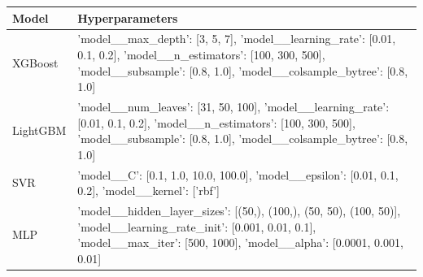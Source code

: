\begin{tabular}{ll}
\toprule
Model & Hyperparameters \\
\midrule
XGBoost & {'model__max_depth': [3, 5, 7], 'model__learning_rate': [0.01, 0.1, 0.2], 'model__n_estimators': [100, 300, 500], 'model__subsample': [0.8, 1.0], 'model__colsample_bytree': [0.8, 1.0]} \\
LightGBM & {'model__num_leaves': [31, 50, 100], 'model__learning_rate': [0.01, 0.1, 0.2], 'model__n_estimators': [100, 300, 500], 'model__subsample': [0.8, 1.0], 'model__colsample_bytree': [0.8, 1.0]} \\
SVR & {'model__C': [0.1, 1.0, 10.0, 100.0], 'model__epsilon': [0.01, 0.1, 0.2], 'model__kernel': ['rbf']} \\
MLP & {'model__hidden_layer_sizes': [(50,), (100,), (50, 50), (100, 50)], 'model__learning_rate_init': [0.001, 0.01, 0.1], 'model__max_iter': [500, 1000], 'model__alpha': [0.0001, 0.001, 0.01]} \\
\bottomrule
\end{tabular}
